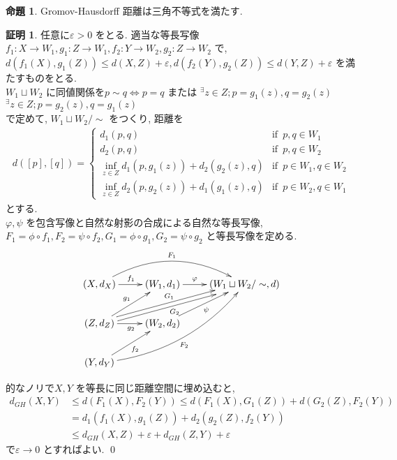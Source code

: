 \documentclass[10pt, fleqn, label-section=none]{bxjsarticle}
\theoremstyle{definition}
\newtheorem{prop}[dfn]{命題}
\newtheorem*{pf*}{証明}
\newcommand{\veps}{\varepsilon}
\newcommand{\LR}{\Leftrightarrow}
\begin{document}
\begin{prop}
Gromov-Hausdorff 距離は三角不等式を満たす.
\end{prop}
\begin{pf*}
任意に$\veps > 0$ をとる. 
適当な等長写像$f_1 :X\rightarrow W_1, g_1 :Z \rightarrow W_1 , f_2 :Y\rightarrow W_2, g_2 :Z \rightarrow W_2$ で, \\
$d(f_1(X), g_1(Z)) \leq d(X,Z) + \veps, d(f_2(Y), g_2(Z)) \leq d(Y,Z) + \veps$ を満たすものをとる. \\
$W_1 \sqcup W_2$ に同値関係を$p \sim q \LR p=q$ または $^\exists z \in Z; p = g_1(z), q = g_2(z)$ $^\exists z \in Z; p = g_2(z), q = g_1(z)$ \\
で定めて, $W_1 \sqcup W_2 / \sim$ をつくり, 距離を
\begin{align*}
d([p], [q]) = 
\begin{cases}
d_1 (p,q) & \textrm{if}\,\,\, p,q \in W_1 \\
d_2 (p,q) & \textrm{if}\,\,\, p,q \in W_2 \\
\inf_{z \in Z} d_1 (p, g_1(z)) + d_2 (g_2(z), q) & \textrm{if}\,\,\, p \in W_1, q \in W_2\\
\inf_{z \in Z} d_2 (p, g_2(z)) + d_1 (g_1(z), q) & \textrm{if}\,\,\, p \in W_2, q \in W_1 
\end{cases}
\end{align*}
とする. \\
$\varphi, \psi$ を包含写像と自然な射影の合成による自然な等長写像, \\
$F_1 = \phi \circ f_1, F_2 = \psi \circ f_2,G_1 = \phi \circ g_1, G_2 = \psi \circ g_2$ と等長写像を定める.
\begin{align*}
\xymatrix{
(X, d_X) \ar[r]^{f_1} \ar@/^24pt/[rr]^{F_1} & (W_1 ,d_1) \ar[r]^{\hspace{-18pt} \varphi} & (W_1\sqcup W_2 / \sim ,d )\\
(Z, d_Z)  \ar[ur]^{g_1} \ar[r]_{g_2}  \ar@<0.5ex>[urr]^{G_1} \ar@<-0.5ex>[urr]_{G_2}& (W_2, d_2) \ar[ur]_{\psi}& \\
(Y, d_Y) \ar@/_18pt/[uurr]_{F_2} \ar[ur]_{f_2}& & 
}
\end{align*}

的なノリで$X,Y$ を等長に同じ距離空間に埋め込むと, \\
\begin{align*}
d_{GH}(X,Y) & \leq d(F_1(X), F_2(Y)) \leq d(F_1(X), G_1(Z)) + d(G_2(Z), F_2(Y)) \\
&= d_1 (f_1(X), g_1(Z)) + d_2 (g_2(Z), f_2(Y)) \\
&\leq d_{GH}(X,Z) + \veps + d_{GH}(Z,Y) + \veps
\end{align*}
で$\veps \rightarrow 0$ とすればよい.
\qed
\end{pf*}
\end{document}
